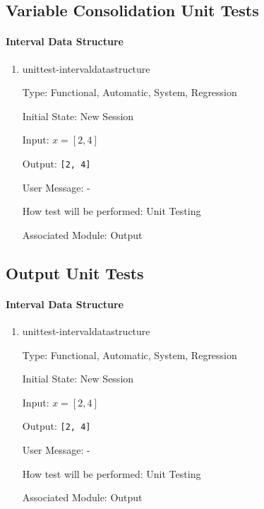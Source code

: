 \documentclass[12pt, titlepage]{article}
\begin{document}
\subsection{Variable Consolidation Unit Tests}

\paragraph{Interval Data Structure}
\begin{enumerate}
	
	\item{unittest-intervaldatastructure}
	
	Type: Functional, Automatic, System, Regression
	
	Initial State: New Session
	
	Input: $x = [2,4]$
	
	Output: \texttt{[2, 4]}
	
	User Message: - 
	
	How test will be performed: Unit Testing
	
	Associated Module: Output\\
	
\end{enumerate}



\subsection{Output Unit Tests}

\paragraph{Interval Data Structure}
\begin{enumerate}
	
	\item{unittest-intervaldatastructure}
	
	Type: Functional, Automatic, System, Regression
	
	Initial State: New Session
	
	Input: $x = [2,4]$
	
	Output: \texttt{[2, 4]}
	
	User Message: - 
	
	How test will be performed: Unit Testing
	
	Associated Module: Output\\
	
\end{enumerate}
\end{document}
